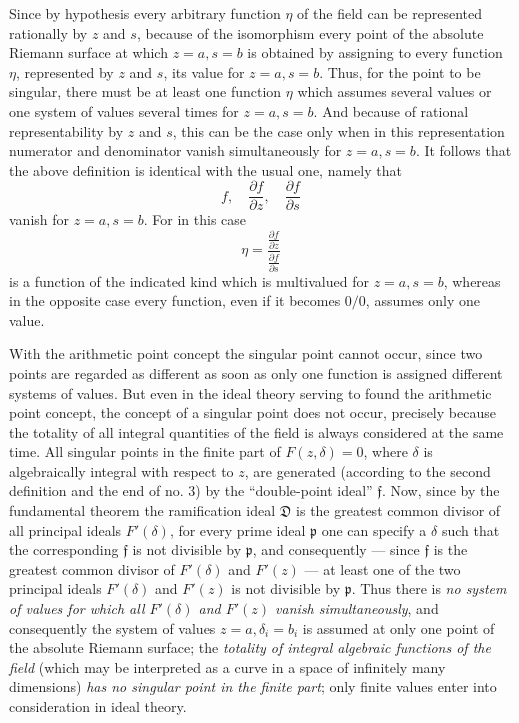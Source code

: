 \documentclass[11pt]{article}
\providecommand{\p}{\partial}
\providecommand{\frp}{\mathfrak p}
\providecommand{\frf}{\mathfrak f}
\providecommand{\frD}{\mathfrak D}
\providecommand{\p}{\partial}
\begin{document}
Since by hypothesis every arbitrary function \(\eta\) of the field can be represented rationally by \(z\) and \(s\), because of the isomorphism every point of the absolute Riemann surface at which \(z=a,s=b\) is obtained by assigning to every function \(\eta\), represented by \(z\) and \(s\), its value for \(z=a,s=b\). Thus, for the point to be singular, there must be at least one function \(\eta\) which assumes several values or one system of values several times for \(z=a,s=b\). And because of rational representability by \(z\) and \(s\), this can be the case only when in this representation numerator and denominator vanish simultaneously for \(z=a,s=b\). It follows that the above definition is identical with the usual one, namely that
\[
f,\quad \frac{\p f}{\p z},\quad \frac{\p f}{\p s}
\]
vanish for \(z=a,s=b\). For in this case
\[
\eta=\frac{\frac{\p f}{\p z}}{\frac{\p f}{\p s}}
\]
is a function of the indicated kind which is multivalued for \(z=a,s=b\), whereas in the opposite case every function, even if it becomes \(0/0\), assumes only one value.

With the arithmetic point concept the singular point cannot occur, since two points are regarded as different as soon as only one function is assigned different systems of values. But even in the ideal theory serving to found the arithmetic point concept, the concept of a singular point does not occur, precisely because the totality of all integral quantities of the field is always considered at the same time. All singular points in the finite part of \(F(z,\delta)=0\), where \(\delta\) is algebraically integral with respect to \(z\), are generated (according to the second definition and the end of no. 3) by the ``double-point ideal'' \(\frf\). Now, since by the fundamental theorem the ramification ideal \(\frD\) is the greatest common divisor of all principal ideals \(F'(\delta)\), for every prime ideal \(\frp\) one can specify a \(\delta\) such that the corresponding \(\frf\) is not divisible by \(\frp\), and consequently --- since \(\frf\) is the greatest common divisor of \(F'(\delta)\) and \(F'(z)\) --- at least one of the two principal ideals \(F'(\delta)\) and \(F'(z)\) is not divisible by \(\frp\). Thus there is \emph{no system of values for which all \(F'(\delta)\) and \(F'(z)\) vanish simultaneously}, and consequently the system of values \(z=a,\delta_i=b_i\) is assumed at only one point of the absolute Riemann surface; the \emph{totality of integral algebraic functions of the field} (which may be interpreted as a curve in a space of infinitely many dimensions) \emph{has no singular point in the finite part}; only finite values enter into consideration in ideal theory.
\end{document}
